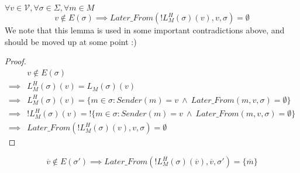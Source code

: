 \begin{lemma}
$\forall v \in \mathcal{V}, \forall \sigma \in \Sigma, \forall m \in M$
$$
  v \notin E(\sigma) \implies Later\_From(!L^H_M(\sigma)(v), v, \sigma) = \emptyset
$$
We note that this lemma is used in some important contradictions above, and should be moved up at some point :)
\end{lemma}

\begin{proof}
\begin{align}
          &v \notin E(\sigma) \\
  \implies&L^H_M(\sigma)(v) = L_M(\sigma)(v) \\
  \implies&L^H_M(\sigma)(v) = \{m \in \sigma : Sender(m) = v ~\land~ Later\_From(m,v,\sigma) = \emptyset\} \\
  \implies&!L^H_M(\sigma)(v) = !\{m \in \sigma : Sender(m) = v ~\land~ Later\_From(m,v,\sigma) = \emptyset\} \\
  \implies&Later\_From(!L^H_M(\sigma)(v),v,\sigma) = \emptyset
\end{align}
\end{proof}


\begin{lemma}
$$
\overline{v} \notin E(\sigma') \implies Later\_From(!L^H_M(\sigma)(\overline{v}), \overline{v}, \sigma') = \{\overline{m}\}
$$
\end{lemma}

